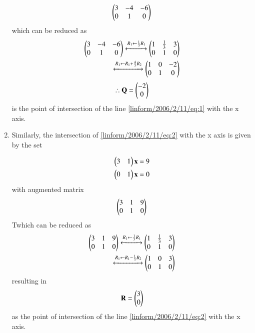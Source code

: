 \begin{enumerate}
\begin{align}
    \begin{pmatrix}3 & -4 & -6\\
           0 & 1 & 0\end{pmatrix}
\end{align}
which  can be reduced as 
\begin{align}
    \begin{pmatrix}3 & -4 & -6\\
           0 & 1 & 0\end{pmatrix}
    \xleftrightarrow {R_1 \leftarrow \frac{1}{3}R_1}
    \begin{pmatrix}1 & \frac{1}{3} & 3\\
          0 & 1 & 0\end{pmatrix}\\
          \xleftrightarrow{R_1 \leftarrow R_1 + \frac{4}{3}R_2}
    \begin{pmatrix}1 &0&-2\\
        0&1&0\end{pmatrix}\\
\end{align}
\begin{align}
\therefore \mathbf{Q}=\begin{pmatrix}-2\\0\end{pmatrix}
\end{align}
is the point of intersection of the line \eqref{linform/2006/2/11/eq:1} with the x axis.
\item Similarly, the intersection of \eqref{linform/2006/2/11/eq:2} with the x axis is given by the set

 \begin{align}
        \begin{pmatrix}3&1\end{pmatrix}\mathbf{x}=9\\
        \begin{pmatrix}0&1\end{pmatrix}\mathbf{x}=0
    \end{align}
 with    augmented matrix 
\begin{align}
    \begin{pmatrix}3 & 1 & 9\\
           0 & 1 & 0\end{pmatrix}
\end{align}
Twhich  can be reduced as 
\begin{align}
    \begin{pmatrix}3 & 1 & 9\\
           0 & 1 & 0\end{pmatrix}
    \xleftrightarrow {R_1 \leftarrow \frac{1}{3}R_1}
    \begin{pmatrix}1 & \frac{1}{3} & 3\\
          0 & 1 & 0\end{pmatrix}\\
          \xleftrightarrow{R_1 \leftarrow R_1 - \frac{1}{3}R_2}
    \begin{pmatrix}1 &0&3\\
        0&1&0\end{pmatrix}\\
\end{align}
resulting in 
\begin{align}
    \mathbf{R}=\begin{pmatrix}3\\0\end{pmatrix}
\end{align}
as the point of intersection of the line \eqref{linform/2006/2/11/eq:2} with the x axis.


\end{enumerate}

